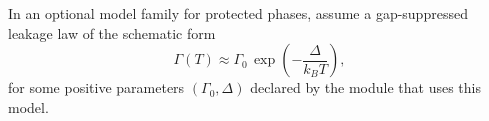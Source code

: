 \begin{assumption}
\label{ass:ppl_gap_suppression_model}
\MatchTag In an optional model family for protected phases, assume a gap-suppressed leakage law of the schematic form
\[
\Gamma(T)\approx \Gamma_0\,\exp\!\left(-\frac{\Delta}{k_B T}\right),
\]
for some positive parameters $(\Gamma_0,\Delta)$ declared by the module that uses this model.
\end{assumption}


